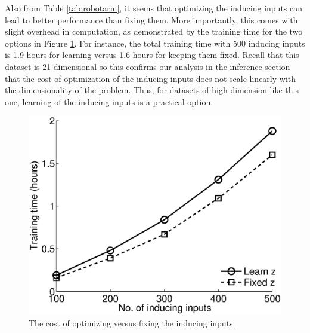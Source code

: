 Also from Table \ref{tab:robotarm}, it seems that optimizing the inducing inputs can lead to better performance than fixing them.
More importantly, this comes with slight overhead in computation, as demonstrated by the training time for the two options in Figure \ref{fig:time}.
For instance, the total training time with 500 inducing inputs is 1.9 hours for learning versus 1.6 hours for keeping them fixed.
Recall that this dataset is 21-dimensional so this confirms our analysis in the inference section that the cost of optimization of the inducing inputs does not scale linearly with the dimensionality of the problem.
Thus, for datasets of high dimension like this one, learning of the inducing inputs is a practical option.

\begin{figure}
\includegraphics[scale=0.4]{figures/sarcosTime.eps}
\caption{The cost of optimizing versus fixing the inducing inputs.}
\label{fig:time}
\end{figure}
